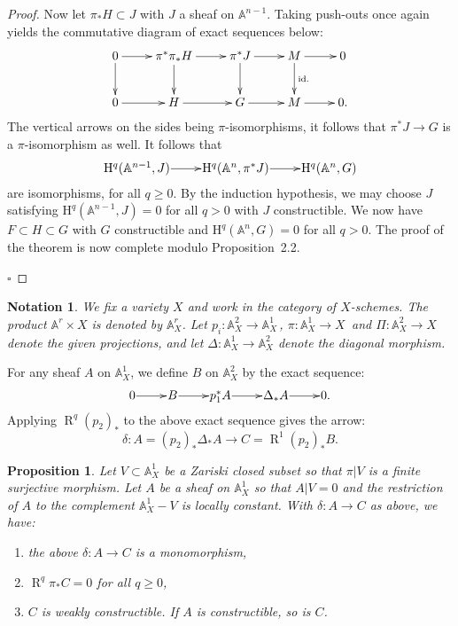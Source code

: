 \documentclass[10pt,twoside]{article}
\newtheorem{prop}[thm]{Proposition}
\newtheorem{notation}[thm]{Notation}
\newcommand{\homology}{{\mathrm {H}}}
\newcommand{\A}{{\mathbb {A}}}
\newcommand{\derived}{{\operatorname{R}}}
\newcommand{\qed}{\nopagebreak\par\hspace*{\fill}$\square$\par\vskip2mm}
\newtheorem{proof}{Proof}
\begin{document}
\begin{proof}
Now let  
$ \pi_*H\subset J$ with $J$ a sheaf on $\A^{n-1}$.
Taking push-outs once again yields the commutative diagram
of exact sequences below:
$$
\xymatrix{
0 \ar[r]\ar[d] & \pi^*\pi_*H \ar[r]\ar[d] & \pi^*J \ar[r]\ar[d] &
M \ar[r]\ar[d]^-{\text{id.}} & 0 \\
0  \ar[r] &  H \ar[r] & G \ar[r] & M \ar[r] & 0. \\
}
$$
The vertical arrows on the sides being $\pi$-isomorphisms, 
it follows
that $\pi^*J \to G$ is a $\pi$-isomorphism as well. It 
follows that 
$$\xymatrix@1{
\homology^q(\A^{n-1},J) \ar[r] & \homology^q(\A^n,\pi^*J) 
\ar[r] &  \homology^q(\A^n, G)}
$$ 
are isomorphisms, for
all $q\geq 0$. By the induction hypothesis, we may choose $J$  
satisfying $\homology^q(\A^{n-1},J)=0$
for all $q>0$ with $J$ constructible.  We now have  
 $F \subset H \subset G$  with $G$ constructible  
and $\homology^q(\A^n, G)=0$ for all $q>0$. 
The proof of the theorem is now complete 
modulo Proposition~2.2.
\qed\end{proof}

\renewcommand{\thethm}{2.1}
\begin{notation}
 We fix a variety $X$ and work in the category of $X$-schemes.
The product $\A^r \times X$ is denoted by $\A^r_X$.  
Let $p_i:\A^2_X \to \A^1_X\,$, $\pi:\A^1_X \to X\,$ and 
$\Pi:\A^2_X \to X$ denote the given projections, and let
 $\Delta :\A^1_X\to \A^2_X$ denote
the diagonal morphism. 
\end{notation}

For any sheaf $A$ on $\A^1_X$, we define $B$ on $ \A^2_X  $
by the exact sequence:  
$$\xymatrix@1{
  0\ar[r] & B \ar[r] & p_1^*A \ar[r] & \Delta_*A \ar[r] & 0.
}
$$
Applying $\derived ^q(p_2)_*$ 
to the above exact sequence gives the arrow: 
$$
\delta : A= (p_2)_* \Delta_*A   \to C=\derived ^1(p_2)_*B.
$$

\renewcommand{\thethm}{2.2}

\begin{prop}Let $V\subset \A^1_X$
be a Zariski closed subset so that $\pi|V$ is a finite 
surjective morphism. Let $A$ be a sheaf on $\A^1_X$ so 
that $A|V=0$ and the restriction of $A$ to the complement
$\A^1_X-V $ is locally constant. With  
$\delta : A \to C$ as above, we have:
\begin{enumerate}
 \item[{\rm (1)}] the above $\delta: A \to C$ is a monomorphism,
\item [{\rm (2)}] $\derived ^q\pi_*C=0$ for all $q\geq 0$,
\item [{\rm (3)}] $C$ is weakly constructible. If $A$ is 
constructible, so is $C$. 
\end{enumerate}
\end{prop}
\end{document}
